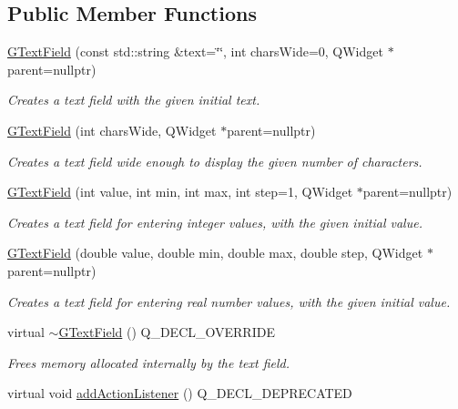 \subsection*{Public Member Functions}
\begin{DoxyCompactItemize}
\item 
\mbox{\hyperlink{classGTextField_aab905bd4d32eef20c4b8ed701a8ec97f}{G\+Text\+Field}} (const std\+::string \&text=\char`\"{}\char`\"{}, int chars\+Wide=0, Q\+Widget $\ast$parent=nullptr)
\begin{DoxyCompactList}\small\item\em Creates a text field with the given initial text. \end{DoxyCompactList}\item 
\mbox{\hyperlink{classGTextField_a036419be062e4f447008a78dae22921c}{G\+Text\+Field}} (int chars\+Wide, Q\+Widget $\ast$parent=nullptr)
\begin{DoxyCompactList}\small\item\em Creates a text field wide enough to display the given number of characters. \end{DoxyCompactList}\item 
\mbox{\hyperlink{classGTextField_a4caf2f90e21e32abf032c99a8c3f8efb}{G\+Text\+Field}} (int value, int min, int max, int step=1, Q\+Widget $\ast$parent=nullptr)
\begin{DoxyCompactList}\small\item\em Creates a text field for entering integer values, with the given initial value. \end{DoxyCompactList}\item 
\mbox{\hyperlink{classGTextField_a8d164bf18d4dd4da6d5af0d23ee3a2c8}{G\+Text\+Field}} (double value, double min, double max, double step, Q\+Widget $\ast$parent=nullptr)
\begin{DoxyCompactList}\small\item\em Creates a text field for entering real number values, with the given initial value. \end{DoxyCompactList}\item 
virtual \mbox{\hyperlink{classGTextField_a5f71a42054388fb9dc24da9d8322ccdd}{$\sim$\+G\+Text\+Field}} () Q\+\_\+\+D\+E\+C\+L\+\_\+\+O\+V\+E\+R\+R\+I\+DE
\begin{DoxyCompactList}\small\item\em Frees memory allocated internally by the text field. \end{DoxyCompactList}\item 
virtual void \mbox{\hyperlink{classGInteractor_a02f20ea6edfa0671f31c4c648a253833}{add\+Action\+Listener}} () Q\+\_\+\+D\+E\+C\+L\+\_\+\+D\+E\+P\+R\+E\+C\+A\+T\+ED

\end{DoxyCompactItemize}
